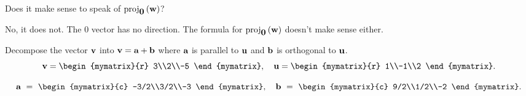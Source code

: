 \begin{enumialphparenastyle}
\begin{ex}
  Does it make sense to speak of $\mbox{\rm proj}_{\mbox{\bf 0}}\left(\mbox{\bf w}\right)$?
  \begin{sol}
    No, it does not. The $0$ vector has no direction. The formula for
    $\mbox{\rm proj}_{\mbox{\bf 0}}\left(\mbox{\bf w}\right)$ doesn't make sense either.
  \end{sol}
\end{ex}

\begin{ex}
  Decompose the vector $\mbox{\bf v}$ into $\mbox{\bf v}=\mbox{\bf a}+\mbox{\bf b}$
  where $\mbox{\bf a}$ is parallel to $\mbox{\bf u}$ and $\mbox{\bf b}$ is
  orthogonal to $\mbox{\bf u}$.
  \begin{equation*}
    \vect{v} = \begin{mymatrix}{r} 3\\2\\-5 \end{mymatrix},\quad
    \vect{u} = \begin{mymatrix}{r} 1\\-1\\2 \end{mymatrix}.
  \end{equation*}
  
  \begin{sol}
    \begin{equation*}
      \vect{a} ~=~ \begin{mymatrix}{c} -3/2\\3/2\\-3 \end{mymatrix},\quad
      \vect{b} ~=~ \begin{mymatrix}{c} 9/2\\1/2\\-2 \end{mymatrix}.
    \end{equation*}
  \end{sol}
\end{ex}


\end{enumialphparenastyle}
